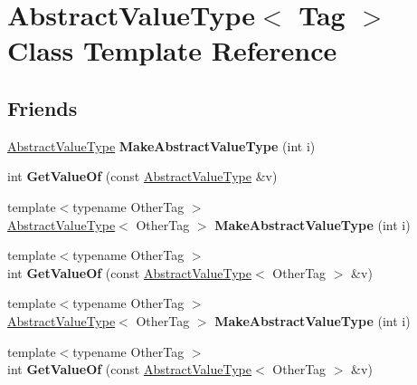 \hypertarget{classAbstractValueType}{}\section{Abstract\+Value\+Type$<$ Tag $>$ Class Template Reference}
\label{classAbstractValueType}
\subsection*{Friends}
\begin{DoxyCompactItemize}
\item 
\hypertarget{classAbstractValueType_add09e75ef83b491145bfae76d4b5a069}{}\hyperlink{classAbstractValueType}{Abstract\+Value\+Type} {\bfseries Make\+Abstract\+Value\+Type} (int i)\label{classAbstractValueType_add09e75ef83b491145bfae76d4b5a069}

\item 
\hypertarget{classAbstractValueType_a92ae7176f84b5df2d05fba9d3a8b9b08}{}int {\bfseries Get\+Value\+Of} (const \hyperlink{classAbstractValueType}{Abstract\+Value\+Type} \&v)\label{classAbstractValueType_a92ae7176f84b5df2d05fba9d3a8b9b08}

\item 
\hypertarget{classAbstractValueType_af179b2488ac7769315c285bed748908d}{}{\footnotesize template$<$typename Other\+Tag $>$ }\\\hyperlink{classAbstractValueType}{Abstract\+Value\+Type}$<$ Other\+Tag $>$ {\bfseries Make\+Abstract\+Value\+Type} (int i)\label{classAbstractValueType_af179b2488ac7769315c285bed748908d}

\item 
\hypertarget{classAbstractValueType_acb6ca7d38174fb4d218d05c42d4a16af}{}{\footnotesize template$<$typename Other\+Tag $>$ }\\int {\bfseries Get\+Value\+Of} (const \hyperlink{classAbstractValueType}{Abstract\+Value\+Type}$<$ Other\+Tag $>$ \&v)\label{classAbstractValueType_acb6ca7d38174fb4d218d05c42d4a16af}

\item 
\hypertarget{classAbstractValueType_af179b2488ac7769315c285bed748908d}{}{\footnotesize template$<$typename Other\+Tag $>$ }\\\hyperlink{classAbstractValueType}{Abstract\+Value\+Type}$<$ Other\+Tag $>$ {\bfseries Make\+Abstract\+Value\+Type} (int i)\label{classAbstractValueType_af179b2488ac7769315c285bed748908d}

\item 
\hypertarget{classAbstractValueType_acb6ca7d38174fb4d218d05c42d4a16af}{}{\footnotesize template$<$typename Other\+Tag $>$ }\\int {\bfseries Get\+Value\+Of} (const \hyperlink{classAbstractValueType}{Abstract\+Value\+Type}$<$ Other\+Tag $>$ \&v)\label{classAbstractValueType_acb6ca7d38174fb4d218d05c42d4a16af}

\end{DoxyCompactItemize}


